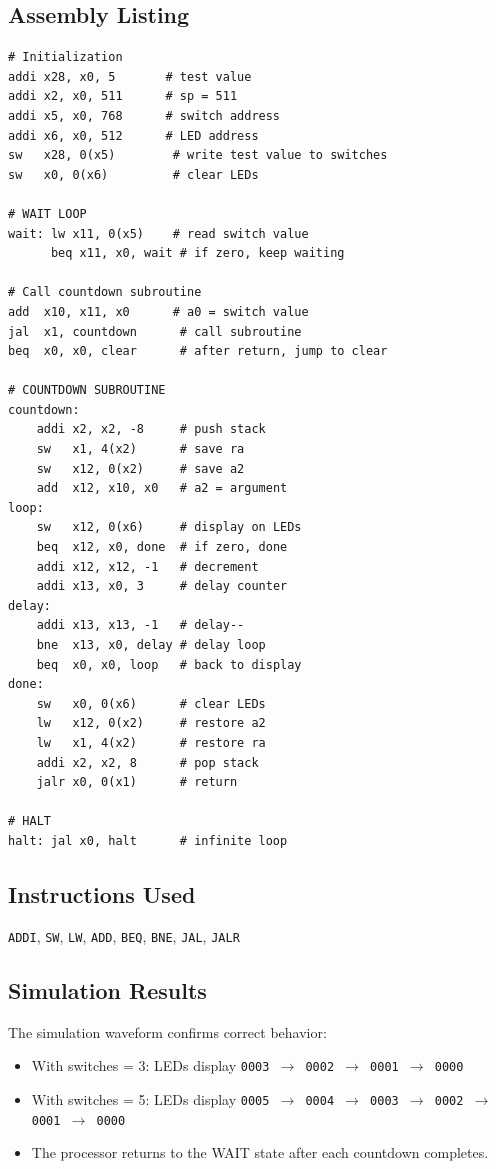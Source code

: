 \documentclass[12pt,a4paper]{article}
\begin{document}
\subsection{Assembly Listing}
\begin{lstlisting}[style=asm, caption={Lab 10 FSM Program}]
# Initialization
addi x28, x0, 5       # test value
addi x2, x0, 511      # sp = 511
addi x5, x0, 768      # switch address
addi x6, x0, 512      # LED address
sw   x28, 0(x5)        # write test value to switches
sw   x0, 0(x6)         # clear LEDs

# WAIT LOOP
wait: lw x11, 0(x5)    # read switch value
      beq x11, x0, wait # if zero, keep waiting

# Call countdown subroutine
add  x10, x11, x0      # a0 = switch value
jal  x1, countdown      # call subroutine
beq  x0, x0, clear      # after return, jump to clear

# COUNTDOWN SUBROUTINE
countdown:
    addi x2, x2, -8     # push stack
    sw   x1, 4(x2)      # save ra
    sw   x12, 0(x2)     # save a2
    add  x12, x10, x0   # a2 = argument
loop:
    sw   x12, 0(x6)     # display on LEDs
    beq  x12, x0, done  # if zero, done
    addi x12, x12, -1   # decrement
    addi x13, x0, 3     # delay counter
delay:
    addi x13, x13, -1   # delay--
    bne  x13, x0, delay # delay loop
    beq  x0, x0, loop   # back to display
done:
    sw   x0, 0(x6)      # clear LEDs
    lw   x12, 0(x2)     # restore a2
    lw   x1, 4(x2)      # restore ra
    addi x2, x2, 8      # pop stack
    jalr x0, 0(x1)      # return

# HALT
halt: jal x0, halt      # infinite loop
\end{lstlisting}

\subsection{Instructions Used}
\texttt{ADDI}, \texttt{SW}, \texttt{LW}, \texttt{ADD}, \texttt{BEQ}, \texttt{BNE}, \texttt{JAL}, \texttt{JALR}

\subsection{Simulation Results}
The simulation waveform confirms correct behavior:
\begin{itemize}
    \item With switches = 3: LEDs display \texttt{0003 $\rightarrow$ 0002 $\rightarrow$ 0001 $\rightarrow$ 0000}
    \item With switches = 5: LEDs display \texttt{0005 $\rightarrow$ 0004 $\rightarrow$ 0003 $\rightarrow$ 0002 $\rightarrow$ 0001 $\rightarrow$ 0000}
    \item The processor returns to the WAIT state after each countdown completes.
\end{itemize}
\end{document}
